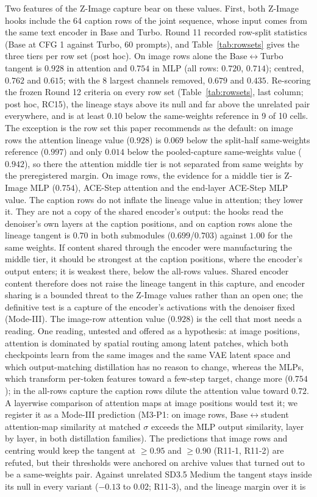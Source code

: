 \documentclass[11pt]{article}
\begin{document}
Two features of the Z-Image capture bear on these values. First, both Z-Image hooks include the 64 caption rows of the joint sequence, whose input comes from the same text encoder in Base and Turbo. Round 11 recorded row-split statistics (Base at CFG 1 against Turbo, 60 prompts), and Table~\ref{tab:rowsets} gives the three tiers per row set (post hoc). On image rows alone the Base$\leftrightarrow$Turbo tangent is $0.928$ in attention and $0.754$ in MLP (all rows: $0.720$, $0.714$); centred, $0.762$ and $0.615$; with the 8 largest channels removed, $0.679$ and $0.435$. Re-scoring the frozen Round 12 criteria on every row set (Table~\ref{tab:rowsets}, last column; post hoc, RC15), the lineage stays above its null and far above the unrelated pair everywhere, and is at least $0.10$ below the same-weights reference in 9 of 10 cells. The exception is the row set this paper recommends as the default: on image rows the attention lineage value ($0.928$) is $0.069$ below the split-half same-weights reference ($0.997$) and only $0.014$ below the pooled-capture same-weights value ($0.942$), so there the attention middle tier is not separated from same weights by the preregistered margin. On image rows, the evidence for a middle tier is Z-Image MLP ($0.754$), ACE-Step attention and the end-layer ACE-Step MLP value. The caption rows do not inflate the lineage value in attention; they lower it. They are not a copy of the shared encoder's output: the hooks read the denoiser's own layers at the caption positions, and on caption rows alone the lineage tangent is $0.70$ in both submodules ($0.699$/$0.703$) against $1.00$ for the same weights. If content shared through the encoder were manufacturing the middle tier, it should be strongest at the caption positions, where the encoder's output enters; it is weakest there, below the all-rows values. Shared encoder content therefore does not raise the lineage tangent in this capture, and encoder sharing is a bounded threat to the Z-Image values rather than an open one; the definitive test is a capture of the encoder's activations with the denoiser fixed (Mode-III). The image-row attention value ($0.928$) is the cell that most needs a reading. One reading, untested and offered as a hypothesis: at image positions, attention is dominated by spatial routing among latent patches, which both checkpoints learn from the same images and the same VAE latent space and which output-matching distillation has no reason to change, whereas the MLPs, which transform per-token features toward a few-step target, change more ($0.754$); in the all-rows capture the caption rows dilute the attention value toward $0.72$. A layerwise comparison of attention maps at image positions would test it; we register it as a Mode-III prediction (M3-P1: on image rows, Base$\leftrightarrow$student attention-map similarity at matched $\sigma$ exceeds the MLP output similarity, layer by layer, in both distillation families). The predictions that image rows and centring would keep the tangent at $\ge0.95$ and $\ge0.90$ (R11-1, R11-2) are refuted, but their thresholds were anchored on archive values that turned out to be a same-weights pair. Against unrelated SD3.5 Medium the tangent stays inside its null in every variant ($-0.13$ to $0.02$; R11-3), and the lineage margin over it is 
\end{document}

